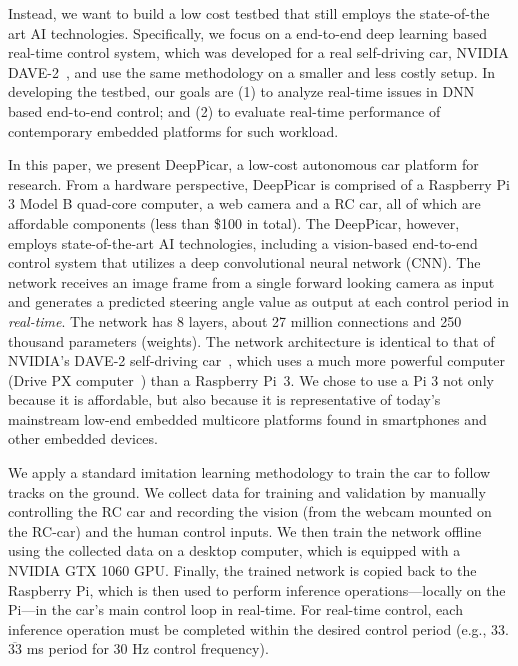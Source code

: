 Instead, we want to build a low cost testbed that still employs the
state-of-the art AI technologies. Specifically, we focus on a end-to-end
deep learning based real-time control system,
which was developed for a real self-driving car, NVIDIA
DAVE-2~\cite{Bojarski2016}, and use the same methodology on a
smaller and less costly setup. In developing the testbed, our
goals are (1) to analyze real-time issues in DNN based end-to-end
control; and (2) to evaluate real-time performance of contemporary embedded
platforms for such workload.

In this paper, we present DeepPicar, a low-cost autonomous car
platform for research. From a hardware perspective,
DeepPicar is comprised of a Raspberry Pi 3 Model B quad-core
computer, a web camera and a RC car, all of which are affordable
components (less than \$100 in total).
The DeepPicar, however, employs state-of-the-art AI
technologies, including a vision-based end-to-end control system that
utilizes a deep convolutional neural network (CNN).
The network receives an image frame from a single forward
looking camera as input and generates a predicted steering angle
value as output at each control period in \emph{real-time}.
The network has 8 layers, about 27 million connections
and 250 thousand parameters (weights).
The network architecture is identical to that of NVIDIA's DAVE-2
self-driving car~\cite{Bojarski2016}, which uses a much more powerful
computer (Drive PX computer~\cite{drivepx}) than a Raspberry Pi~3.
We chose to use a Pi 3 not only because it is affordable, but also because it is representative
of today's mainstream low-end embedded multicore platforms found in
smartphones and other embedded devices.


We apply a standard imitation learning methodology to train the car to
follow tracks on the ground. We collect data for
training and validation by manually
controlling the RC car and recording the vision (from the webcam
mounted on the RC-car) and the human control inputs. We then train the
network offline using the collected data on a desktop computer, which
is equipped with a NVIDIA GTX 1060 GPU. Finally, the trained network is copied
back to the Raspberry Pi, which is then used to perform inference
operations---locally on the Pi---in the car's main control loop in
real-time. For real-time control, each inference operation must
be completed within the desired control period (e.g., 33.$\overline{\mbox{33}}$ ms
 period for 30 Hz control frequency).

